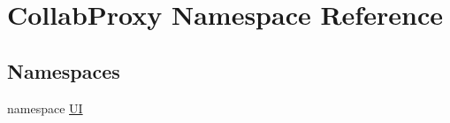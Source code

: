 \hypertarget{namespace_collab_proxy}{}\section{Collab\+Proxy Namespace Reference}
\label{namespace_collab_proxy}
\subsection*{Namespaces}
\begin{DoxyCompactItemize}
\item 
namespace \mbox{\hyperlink{namespace_collab_proxy_1_1_u_i}{UI}}
\end{DoxyCompactItemize}
